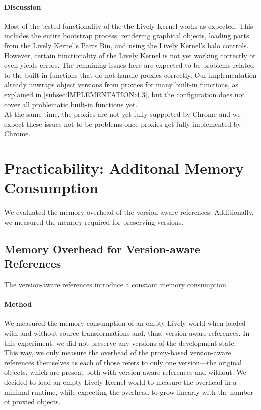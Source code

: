 \paragraph{Discussion}
Most of the tested functionality of the the Lively Kernel works as expected.
This includes the entire bootstrap process, rendering graphical objects, loading parts from the Lively Kernel's Parts Bin, and using the Lively Kernel's halo controls.
However, certain functionality of the Lively Kernel is not yet working correctly or even yields errors.
The remaining issues here are expected to be problems related to the built-in functions that do not handle proxies correctly.
Our implementation already unwraps object versions from proxies for many built-in functions, as explained in \ref{subsec:IMPLEMENTATION:4.3}, but the configuration does not cover all problematic built-in functions yet.\\
At the same time, the proxies are not yet fully supported by Chrome and we expect these issues not to be problems once proxies get fully implemented by Chrome.\\



\section{Practicability: Additonal Memory Consumption} \label{sec:EVALUATION:3}

We evaluated the memory overhead of the version-aware references.
Additionally, we measured the memory required for preserving versions.

\subsection{Memory Overhead for Version-aware References}

The version-aware references introduce a constant memory consumption.

\paragraph{Method}
We measured the memory consumption of an empty Lively world when loaded with and without source transformations and, thus, version-aware references.
In this experiment, we did not preserve any versions of the development state.\\
This way, we only measure the overhead of the proxy-based version-aware references themselves as each of those refers to only one version---the original objects, which are present both with version-aware references and without.
We decided to load an empty Lively Kernel world to measure the overhead in a minimal runtime, while expecting the overhead to grow linearly with the number of proxied objects.

